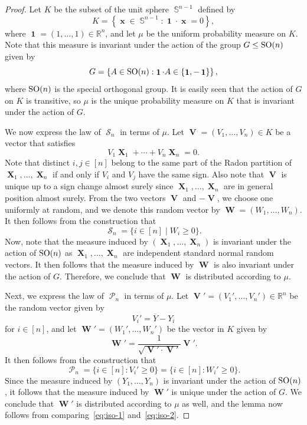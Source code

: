 \documentclass[12pt,english,reqno]{amsart}
\theoremstyle{plain}
\theoremstyle{remark}
\numberwithin{figure}{section}
\numberwithin{equation}{section}
\def\rr{\mathbb{R}}
\def\bY{\overline{Y}}
\DeclareMathOperator{\one}{\mathbf{1}} %
\DeclareMathOperator{\cP}{\mathcal{P}} %
\DeclareMathOperator{\cS}{\mathcal{S}} %
\DeclareMathOperator{\SO}{\textnormal{SO}} %
\DeclareMathOperator{\sphere}{\mathbb{S}} %
\DeclareMathOperator{\xb}{\mathbf{x}} %
\DeclareMathOperator{\Xb}{\mathbf{X}} %
\DeclareMathOperator{\Vb}{\mathbf{V}} %
\DeclareMathOperator{\Wb}{\mathbf{W}} %
\begin{document}
\begin{proof}
	Let $K$ be the subset of the unit sphere $\sphere^{n-1}$ defined by
	\[ K = \left \{ \xb \in \sphere^{n-1} : \one \cdot \xb=0 \right \}, \]
	where $\one=(1,\dots, 1) \in \rr^n$, and let $\mu$ be the uniform probability measure on $K$. Note that this measure is invariant under the action of the group $G \leq \SO(n)$ given by
	\[ G = \left \{ A \in \SO(n):  \one \cdot A \in \{\one,-\one\} \right\}, \]
    where $\SO(n)$ is the special orthogonal group.
	It is easily seen that the action of $G$ on $K$ is transitive, so $\mu$ is the unique probability measure on $K$ that is invariant under the action of $G$.

	We now express the law of $\cS_n$ in terms of $\mu$. Let $\Vb=(V_1,\dots, V_{n}) \in K$ be a vector that satisfies
	\[
		V_1 \Xb_1 + \cdots + V_{n} \Xb_{n} = 0.
	\]
	Note that distinct $i,j \in [n]$ belong to the same part of the Radon partition of $\Xb_1,\dots, \Xb_{n}$ if and only if $V_i$ and $V_j$ have the same sign. Also note that $\Vb$ is unique up to a sign change almost surely since $\Xb_1,\dots, \Xb_{n}$ are in general position almost surely. From the two vectors $\Vb$ and $-\Vb$, we choose one uniformly at random, and we denote this random vector by $\Wb=(W_1,\dots, W_{n})$. It then follows from the construction that
	\begin{equation}\label{eq:iso-1}
		\cS_n = \{ i \in [n] \mid W_i \geq 0 \}.
	\end{equation}
	Now, note that the measure induced by $(\Xb_1,\dots, \Xb_{n})$ is invariant under the action of $\SO(n)$ as $\Xb_1,\dots, \Xb_n$ are independent standard normal random vectors. It then follows that the measure induced by $\Wb$ is also invariant under the action of $G$. Therefore, we conclude that $\Wb$ is distributed according to $\mu$.


	Next, we express the law of $\cP_n$ in terms of $\mu$. Let $\Vb'=(V_1',\dots, V_n') \in \rr^n$ be the random vector given by
	\[ V_i' = \bY - Y_i \]
	for $i \in [n]$,  and let $\Wb'=(W_1',\dots, W_n')$ be the vector in $K$ given by
	\[ \Wb' = \frac{1}{\sqrt{\Vb' \cdot \Vb'}} \Vb'. \]
	It then follows from the construction that
	\begin{equation}\label{eq:iso-2}
		\cP_n = \{ i \in [n] :  V_i' \geq 0 \} = \{ i \in [n] :  W_i' \geq 0 \}.
	\end{equation}
	Since the measure induced by $(Y_1,\dots, Y_n)$ is invariant under the action of $\SO(n)$, it follows that the measure induced by $\Wb'$ is unique under the action of $G$. We conclude that $\Wb'$ is distributed according to $\mu$ as well, and the lemma now follows from comparing~\eqref{eq:iso-1} and~\eqref{eq:iso-2}.
\end{proof}
\end{document}
